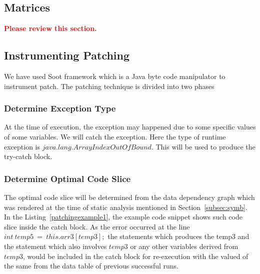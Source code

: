 \documentclass{sigplanconf}
\begin{document}


\subsection{Matrices}
\label{subsec:martices}

\textcolor{red}{\textbf{Please review this section.}}\newline

\subsection{Instrumenting Patching}
\label{subsec:patchinstru}

We have used Soot framework which is a Java byte code manipulator to instrument patch. 
The patching technique is divided into two phases

\subsubsection{Determine Exception Type} 

At the time of execution, the exception may happened due to some specific values of some variables. We will catch the exception. Here the type of 
runtime exception is $java.lang.ArrayIndexOutOfBound$. This will be used to produce the try-catch block.
 
\subsubsection{Determine Optimal Code Slice}

The optimal code slice will be determined from the data dependency graph which was rendered at the time of static analysis mentioned in 
Section~\ref{subsec:symb}. In the Listing~\ref{patchingexample1}, the example code snippet shows such code slice inside the catch block. 
As the error occurred at the line $int\ temp5\ =\ this.arr3[temp3];$ the statements which produces the temp3 and the statement which also 
involves $temp3$ or any other variables derived from $temp3$, would be included in the catch block for re-execution with the valued of the 
same from the data table of previous successful runs.
\end{document}
